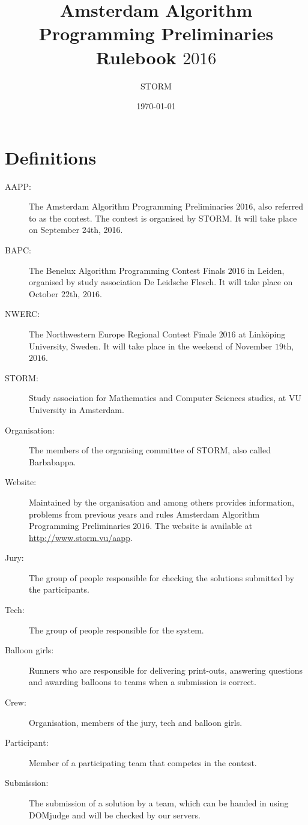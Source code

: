 \documentclass[11pt]{report}
\title{Amsterdam Algorithm Programming Preliminaries Rulebook $2016$}
\author{STORM}
\date{\today}
\begin{document}
\maketitle
\tableofcontents
\clearpage

\chapter{Definitions}
\begin{description}
\item[AAPP:]
The Amsterdam Algorithm Programming Preliminaries $2016$, also referred to as the contest. The contest is organised by STORM. It will take place on September $24$th, 2016.

\item[BAPC:]
The Benelux Algorithm Programming Contest Finals $2016$ in Leiden, organised by study association De Leidsche Flesch. It will take place on October $22$th, $2016$.

\item[NWERC:]
The Northwestern Europe Regional Contest Finale $2016$ at Link\"oping University, Sweden. It will take place in the weekend of November $19$th, $2016$.

\item[STORM:]
Study association for Mathematics and Computer Sciences studies, at VU University in Amsterdam.

\item[Organisation:]
The members of the organising committee of STORM, also called Barbabappa.

\item[Website:]
Maintained by the organisation and among others provides information, problems from previous years and rules Amsterdam Algorithm Programming Preliminaries $2016$. The website is available at \url{http://www.storm.vu/aapp}.

\item[Jury:]
The group of people responsible for checking the solutions submitted by the participants.

\item[Tech:]
The group of people responsible for the system.

\item[Balloon girls:]
Runners who are responsible for delivering print-outs, answering questions and awarding balloons to teams when a submission is correct.

\item[Crew:]
Organisation, members of the jury, tech and balloon girls. 

\item[Participant:]
Member of a participating team that competes in the contest. 

\item[Submission:]
The submission of a solution by a team, which can be handed in using DOMjudge and will be checked by our servers.
\end{description}
\end{document}
